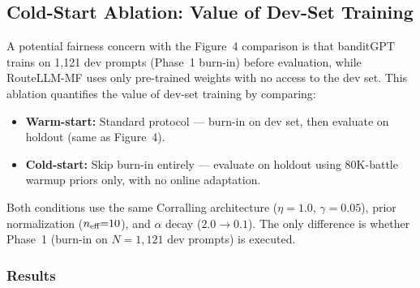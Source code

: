 
\subsection{Cold-Start Ablation: Value of Dev-Set Training}
\label{appendix:cold_start}

A potential fairness concern with the Figure~4 comparison is that banditGPT
trains on 1,121 dev prompts (Phase~1 burn-in) before evaluation, while
RouteLLM-MF uses only pre-trained weights with no access to the dev set.
This ablation quantifies the value of dev-set training by comparing:

\begin{itemize}[leftmargin=*,noitemsep]
    \item \textbf{Warm-start:} Standard protocol --- burn-in on dev set,
          then evaluate on holdout (same as Figure~4).
    \item \textbf{Cold-start:} Skip burn-in entirely --- evaluate on holdout
          using 80K-battle warmup priors only, with no online adaptation.
\end{itemize}

Both conditions use the same Corralling architecture ($\eta{=}1.0$,
$\gamma{=}0.05$), prior normalization ($n_{\text{eff}}{=}10$), and $\alpha$ decay
($2.0 \to 0.1$).  The only difference is whether Phase~1 (burn-in on
$N{=}1{,}121$ dev prompts) is executed.

\subsubsection{Results}

